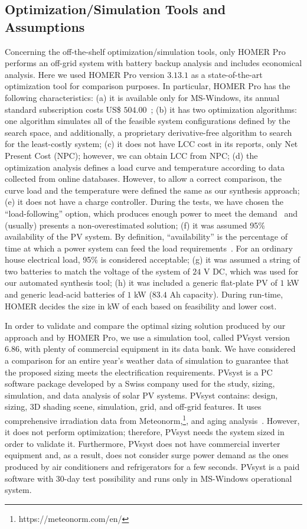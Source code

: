 \documentclass[runningheads]{llncs}
\begin{document}
\subsection{Optimization/Simulation Tools and Assumptions}
Concerning the off-the-shelf optimization/simulation tools, only HOMER Pro performs an off-grid system with battery backup analysis and includes economical analysis. Here we used HOMER Pro version $3.13.1$ as a state-of-the-art optimization tool for comparison purposes. In particular, HOMER Pro has the following characteristics:
(a) it is available only for MS-Windows, its annual standard subscription costs US\$ $504.00$~\cite{HOMER}; 
(b) it has two optimization algorithms: one algorithm simulates all of the feasible system configurations defined by the search space, and additionally, a proprietary derivative-free algorithm to search for the least-costly system;
(c) it does not have LCC cost in its reports, only Net Present Cost (NPC); however, we can obtain LCC from NPC; 
(d) the optimization analysis defines a load curve and temperature according to data collected from online databases. However, to allow a correct comparison, the curve load and the temperature were defined the same as our synthesis approach; 
(e) it does not have a charge controller. During the tests, we have chosen the ``load-following'' option, which produces enough power to meet the demand~\cite{HOMER} and (usually) presents a non-overestimated solution; 
(f) it was assumed 95\% availability of the PV system. By definition, ``availability'' is the percentage of time at which a power system can feed the load requirements~\cite{Khatib2014}. For an ordinary house electrical load, 95\% is considered acceptable;
(g) it was assumed a string of two batteries to match the voltage of the system of $24$ V DC, which was used for our automated synthesis tool; 
(h) it was included a generic flat-plate PV of $1$ kW and generic lead-acid batteries of $1$ kW ($83.4$ Ah capacity). During run-time, HOMER decides the size in kW of each based on feasibility and lower cost.

In order to validate and compare the optimal sizing solution produced by our approach and by HOMER Pro, we use a simulation tool, called PVsyst version $6.86$, with plenty of commercial equipment in its data bank. We have considered a comparison for an entire year's weather data of simulation to guarantee that the proposed sizing meets the electrification requirements. PVsyst is a PC software package developed by a Swiss company used for the study, sizing, simulation, and data analysis of solar PV systems. PVsyst contains: design, sizing, 3D shading scene, simulation, grid, and off-grid features. It uses comprehensive irradiation data from Meteonorm,\footnote{https://meteonorm.com/en/}, and aging analysis~\cite{PVsyst2017}. However, it does not perform optimization; therefore, PVsyst needs the system sized in order to validate it. Furthermore, PVsyst does not have commercial inverter equipment and, as a result, does not consider surge power demand as the ones produced by air conditioners and refrigerators for a few seconds. PVsyst is a paid software with $30$-day test possibility and runs only in MS-Windows operational system.
\end{document}

